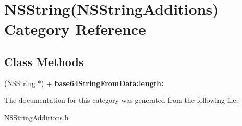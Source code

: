 \hypertarget{category_n_s_string_07_n_s_string_additions_08}{\section{N\+S\+String(N\+S\+String\+Additions) Category Reference}
\label{category_n_s_string_07_n_s_string_additions_08}
}
\subsection*{Class Methods}
\begin{DoxyCompactItemize}
\item 
\hypertarget{category_n_s_string_07_n_s_string_additions_08_a1e3e46f1b572da8ef2c6d3f96a7c098a}{(N\+S\+String $\ast$) + {\bfseries base64\+String\+From\+Data\+:length\+:}}\label{category_n_s_string_07_n_s_string_additions_08_a1e3e46f1b572da8ef2c6d3f96a7c098a}

\end{DoxyCompactItemize}


The documentation for this category was generated from the following file\+:\begin{DoxyCompactItemize}
\item 
N\+S\+String\+Additions.\+h\end{DoxyCompactItemize}
